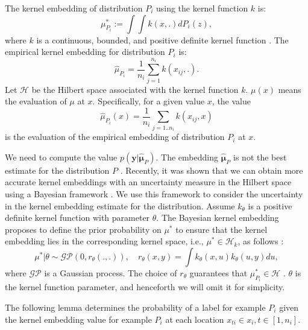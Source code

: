 	The kernel embedding of distribution $P_i$ using the kernel function $k$ is:
	\begin{equation}
		\mu^*_{P_i} := \int \int k(x, .) dP_i(z),
	\end{equation}
	where $k$ is a continuous, bounded, and positive definite kernel function \cite{muandet2012domain}. The empirical kernel embedding for distribution $P_i$ is:
	\begin{equation}
		\hat{\mu}_{P_i} = \frac{1}{n_i} \sum_{j=1}^{n_i} k(x_{ij}, .).
	\end{equation}
	Let $\mathcal{H}$ be the Hilbert space associated with the kernel function $k$. $\mu(x)$ means the evaluation of $\mu$ at $x$. Specifically, for a given value $x$, the value
	\begin{equation}
		\hat{\mu}_{P_i}(x) = \frac{1}{n_i} \sum_{j=1..n_i} k(x_{ij}, x)
	\end{equation}
	is the evaluation of the empirical embedding of distribution $P_i$ at $x$.
	
	We need to compute the value $p(\mathbf{y}|\hat{\boldsymbol{\mu}}_P)$. The embedding $\hat{\boldsymbol{\mu}}_P$ is not the best estimate for the distribution $P$ \cite{muandet2012domain}. Recently, it was shown that we can obtain more accurate kernel embeddings with an uncertainty measure in the Hilbert space using a Bayesian framework \cite{flaxman2015fast}. We use this framework to consider the uncertainty in the kernel embedding estimate for the distribution. Assume $k_\theta$ is a positive definite kernel function with parameter $\theta$. The Bayesian kernel embedding proposes to define the prior probability on $\mu^*$ to ensure that the kernel embedding lies in the corresponding kernel space, i.e., $\mu^* \in \mathcal{H}_k$, as follows \cite{flaxman2015fast}:
	\begin{equation}
		\mu^* | \theta \sim \mathcal{GP}(0, r_\theta(., .)), \quad r_\theta(x, y) = \int k_\theta(x, u) k_\theta(u, y) du,
	\end{equation}
	where $\mathcal{GP}$ is a Gaussian process. The choice of $r_\theta$ guarantees that $\mu^*_{P_i} \in \mathcal{H}$ \cite{flaxman2015fast}. $\theta$ is the kernel function parameter, and henceforth we will omit it for simplicity.
	
	The following lemma determines the probability of a label for example $P_i$ given the kernel embedding value for example $P_i$ at each location $x_{ti} \in x_i, t \in [1, n_i]$.
	
